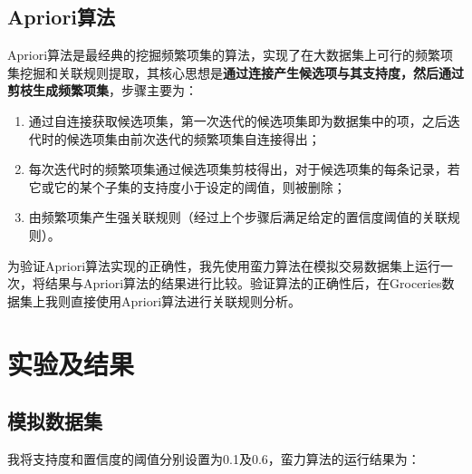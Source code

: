 \documentclass[12pt,a4paper]{article}
\theoremstyle{definition}
\begin{document}
\subsection{Apriori算法}

\vspace{0.006\linewidth}
Apriori算法是最经典的挖掘频繁项集的算法，实现了在大数据集上可行的频繁项集挖掘和关联规则提取，其核心思想是\textbf{通过连接产生候选项与其支持度，然后通过剪枝生成频繁项集}，步骤主要为：

\begin{enumerate}

\item 通过自连接获取候选项集，第一次迭代的候选项集即为数据集中的项，之后迭代时的候选项集由前次迭代的频繁项集自连接得出；

\item 每次迭代时的频繁项集通过候选项集剪枝得出，对于候选项集的每条记录，若它或它的某个子集的支持度小于设定的阈值，则被删除；

\item 由频繁项集产生强关联规则（经过上个步骤后满足给定的置信度阈值的关联规则）。

\end{enumerate}

为验证Apriori算法实现的正确性，我先使用蛮力算法在模拟交易数据集上运行一次，将结果与Apriori算法的结果进行比较。验证算法的正确性后，在Groceries数据集上我则直接使用Apriori算法进行关联规则分析。


\section{实验及结果}

\subsection{模拟数据集}

我将支持度和置信度的阈值分别设置为0.1及0.6，蛮力算法的运行结果为：
\end{document}
